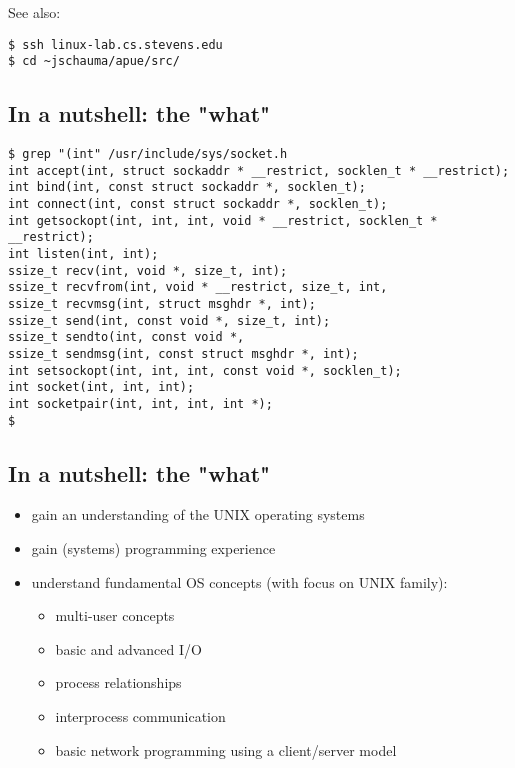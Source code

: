 \documentclass[xga]{xdvislides}
\begin{document}
See also:
\begin{verbatim}
$ ssh linux-lab.cs.stevens.edu
$ cd ~jschauma/apue/src/
\end{verbatim}

\subsection{In a nutshell: the "what"}
\begin{verbatim}
$ grep "(int" /usr/include/sys/socket.h
int	accept(int, struct sockaddr * __restrict, socklen_t * __restrict);
int	bind(int, const struct sockaddr *, socklen_t);
int	connect(int, const struct sockaddr *, socklen_t);
int	getsockopt(int, int, int, void * __restrict, socklen_t * __restrict);
int	listen(int, int);
ssize_t	recv(int, void *, size_t, int);
ssize_t	recvfrom(int, void * __restrict, size_t, int,
ssize_t	recvmsg(int, struct msghdr *, int);
ssize_t	send(int, const void *, size_t, int);
ssize_t	sendto(int, const void *,
ssize_t	sendmsg(int, const struct msghdr *, int);
int	setsockopt(int, int, int, const void *, socklen_t);
int	socket(int, int, int);
int	socketpair(int, int, int, int *);
$
\end{verbatim}

\subsection{In a nutshell: the "what"}
\begin{itemize}
	\item gain an understanding of the UNIX operating systems
	\item gain (systems) programming experience
	\item understand fundamental OS concepts (with focus on UNIX family):
		\begin{itemize}
			\item multi-user concepts
			\item basic and advanced I/O
			\item process relationships
			\item interprocess communication
			\item basic network programming using a client/server model
		\end{itemize}
\end{itemize}
\end{document}
